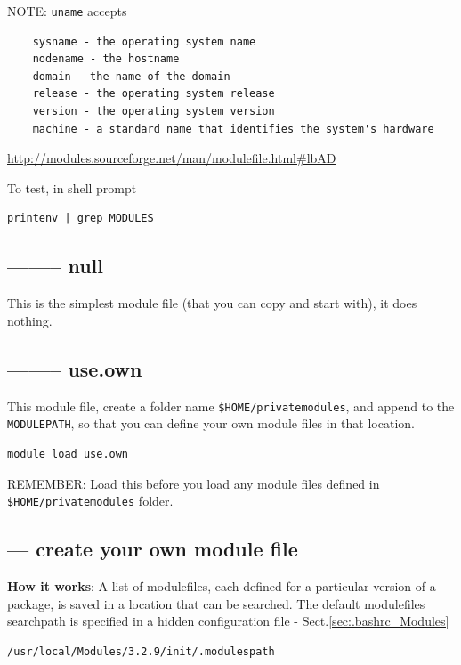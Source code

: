 NOTE: \verb!uname! accepts
\begin{verbatim}
    sysname - the operating system name 
    nodename - the hostname 
    domain - the name of the domain 
    release - the operating system release 
    version - the operating system version 
    machine - a standard name that identifies the system's hardware 
\end{verbatim}
\url{http://modules.sourceforge.net/man/modulefile.html#lbAD}


To test, in shell prompt
\begin{verbatim}
printenv | grep MODULES
\end{verbatim}

\subsection{-------- null}

This is the simplest module file (that you can copy and start with), it does
nothing.

\subsection{-------- use.own}

This module file, create a folder name \verb!$HOME/privatemodules!, and append
to the \verb!MODULEPATH!, so that you can define your own module files in that
location. 

\begin{verbatim}
module load use.own
\end{verbatim}

REMEMBER: Load this before you load any module files defined in
\verb!$HOME/privatemodules! folder.

\subsection{--- create your own module file}

\begin{mdframed}

{\bf How it works}: A list of modulefiles, each defined for a particular version
of a package, is saved in a location that can be searched. The default
modulefiles searchpath is specified in a hidden configuration file -
Sect.\ref{sec:.bashrc_Modules}
\begin{verbatim}
/usr/local/Modules/3.2.9/init/.modulespath
\end{verbatim}

\end{mdframed}

